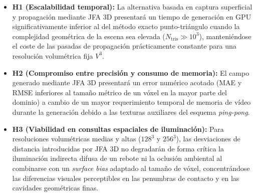 \begin{itemize}
  \item \textbf{H1 (Escalabilidad temporal):} La alternativa basada en captura superficial y propagación mediante JFA 3D presentará un tiempo de generación en GPU significativamente inferior al del método exacto punto-triángulo cuando la complejidad geométrica de la escena sea elevada ($N_{\text{tris}} \gg 10^3$), manteniéndose el coste de las pasadas de propagación prácticamente constante para una resolución volumétrica fija $V^3$.
  \item \textbf{H2 (Compromiso entre precisión y consumo de memoria):} El campo generado mediante JFA 3D presentará un error numérico acotado (MAE y RMSE inferiores al tamaño métrico de un vóxel en la mayor parte del dominio) a cambio de un mayor requerimiento temporal de memoria de vídeo durante la generación debido a las texturas auxiliares del esquema \textit{ping-pong}.
  \item \textbf{H3 (Viabilidad en consultas espaciales de iluminación):} Para resoluciones volumétricas medias y altas ($128^3$ y $256^3$), las desviaciones de distancia introducidas por JFA 3D no degradarán de forma crítica la iluminación indirecta difusa de un rebote ni la oclusión ambiental al combinarse con un \textit{surface bias} adaptado al tamaño de vóxel, concentrándose las diferencias visuales perceptibles en las penumbras de contacto y en las cavidades geométricas finas.
\end{itemize}
